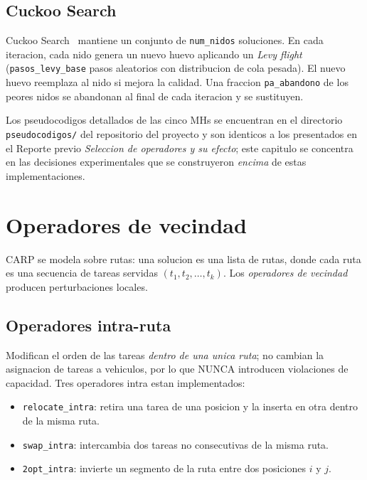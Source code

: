 \subsection{Cuckoo Search}

Cuckoo Search~\cite{yang2009} mantiene un conjunto de \texttt{num\_nidos} soluciones.
En cada iteracion, cada nido genera un nuevo huevo aplicando un
\emph{Levy flight} (\texttt{pasos\_levy\_base} pasos aleatorios con
distribucion de cola pesada). El nuevo huevo reemplaza al nido si
mejora la calidad. Una fraccion \texttt{pa\_abandono} de los peores
nidos se abandonan al final de cada iteracion y se sustituyen.

Los pseudocodigos detallados de las cinco MHs se encuentran en el
directorio \texttt{pseudocodigos/} del repositorio del proyecto y son
identicos a los presentados en el Reporte previo
\emph{Seleccion de operadores y su efecto}; este capitulo se concentra
en las decisiones experimentales que se construyeron \emph{encima} de
estas implementaciones.

\section{Operadores de vecindad}
\label{sec:operadores}

CARP se modela sobre rutas: una solucion es una lista de rutas, donde
cada ruta es una secuencia de tareas servidas $(t_1, t_2, \dots, t_k)$.
Los \emph{operadores de vecindad} producen perturbaciones locales.

\subsection{Operadores intra-ruta}

Modifican el orden de las tareas \emph{dentro de una unica ruta}; no
cambian la asignacion de tareas a vehiculos, por lo que NUNCA introducen
violaciones de capacidad. Tres operadores intra estan implementados:

\begin{itemize}
\item \texttt{relocate\_intra}: retira una tarea de una posicion y la
  inserta en otra dentro de la misma ruta.
\item \texttt{swap\_intra}: intercambia dos tareas no consecutivas de
  la misma ruta.
\item \texttt{2opt\_intra}: invierte un segmento de la ruta entre dos
  posiciones $i$ y $j$.
\end{itemize}


